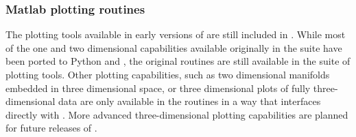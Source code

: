 \subsubsection{Matlab plotting routines}
The \mlab plotting tools available in early versions of \clawpack are
still included in
\visclaw.  While most of the one and two dimensional capabilities
available originally in the \mlab suite have been ported to Python and
\mplotlib, the original \mlab routines are still available in the \mlab suite of
plotting tools.  Other plotting capabilities, such as two dimensional
manifolds embedded in three dimensional space, or three dimensional
plots of fully three-dimensional data are only available in the \mlab routines
in a way that
interfaces directly with \clawpack.
More advanced three-dimensional plotting capabilities are planned for future
releases of
\visclaw.
